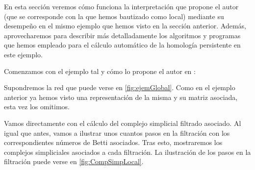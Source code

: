 \documentclass[12pt, a4paper, twoside]{book}
\numberwithin{equation}{section}
\theoremstyle{definition}
\newenvironment{ejem}
  {\pushQED{\qed}\renewcommand{\qedsymbol}{$\blacktriangleleft$}\ejemplo}
  {\popQED\endejemplo}
\theoremstyle{remark}
\theoremstyle{plain}
\begin{document}
	En esta sección veremos cómo funciona la interpretación que propone 
	el autor (que se corresponde con la que hemos bautizado como local) 
	mediante su desempeño en el mismo ejemplo que hemos visto en la 
	sección anterior. Además, aprovecharemos para describir más 
	detalladamente los algoritmos y programas que hemos empleado para el 
	cálculo automático de la homología persistente en este ejemplo.

	Comenzamos con el ejemplo tal y cómo lo propone el autor en 
	\cite{Articulo-Watanabe}:
	
	\begin{ejem}
		Supondremos la red que puede verse en 
		\autoref{fig:ejemGlobal}. Como en el ejemplo 
		anterior ya hemos visto una representación de la misma y su 
		matriz asociada, esta vez los omitimos.

		Vamos directamente con el cálculo del complejo simplicial 
		filtrado asociado. Al igual que antes, vamos a ilustrar unos 
		cuantos pasos en la filtración con los correspondientes 
		números de Betti asociados. Tras esto, mostraremos los 
		complejos simpliciales asociados a cada filtración. La 
		ilustración de los pasos en la filtración puede verse en 
		\autoref{fig:CompSimpLocal}.

		\begin{figure}[!htbp]
\end{figure}
\end{ejem}
\end{document}
